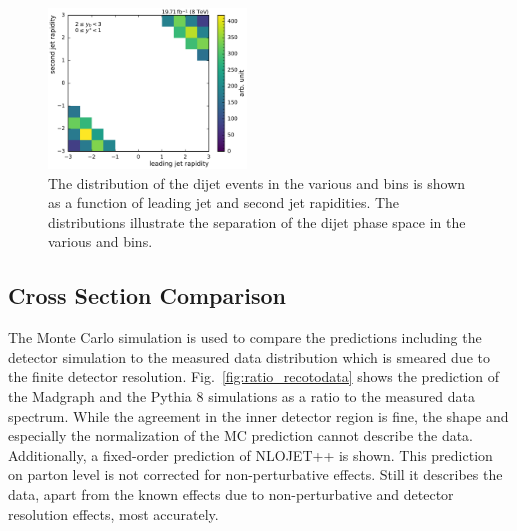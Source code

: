 \begin{figure}[htbp]
    \includegraphics[width=0.47\textwidth]{figures/measurement/jet12_rapidity_yb2ys0.pdf}
    \caption[Rapidities of the two leading jets in the various \ystar and \yboost bins]{
             The distribution of the dijet events in the various \ystar and
             \yboost bins is shown as a function of leading jet and second jet
             rapidities. The distributions illustrate the separation of the
             dijet phase space in the various \ystar and \yboost bins.}
    \label{fig:controlplots:rapidity}
\end{figure}


\subsection{Cross Section Comparison}

The Monte Carlo simulation is used to compare the predictions including the
detector simulation to the measured data distribution which is smeared due to
the finite detector resolution. Fig.~\ref{fig:ratio_recotodata} shows the
prediction of the Madgraph and the Pythia 8 simulations as a ratio to the
measured data spectrum. While the agreement in the inner detector region is
fine, the shape and especially the normalization of the MC prediction cannot
describe the data. Additionally, a fixed-order prediction of NLOJET++ is shown.
This prediction on parton level is not corrected for non-perturbative
effects. Still it describes the data, apart from the known effects due to
non-perturbative and detector resolution effects, most accurately.

